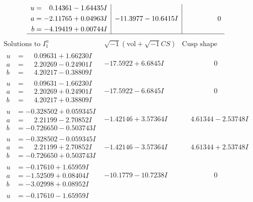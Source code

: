 \documentclass[1p]{elsarticle_modified}
\theoremstyle{definition}
\newcommand{\I}{\sqrt{-1}}
\begin{document}
$$\begin{array}{c|c|c}
\begin{aligned}
u &= \phantom{-}0.14361 - 1.64435 I \\
a &= -2.11765 + 0.04963 I \\
b &= -4.19419 + 0.00744 I\end{aligned}
 & -11.3977 - 10.6415 I & \phantom{-0.000000 } 0\\
 \hline 
 \end{array}$$\newpage$$\begin{array}{c|c|c}  
\text{Solutions to }I^u_{1}& \I (\text{vol} + \sqrt{-1}CS) & \text{Cusp shape}\\
 \hline 
\begin{aligned}
u &= \phantom{-}0.09631 + 1.66230 I \\
a &= \phantom{-}2.20269 - 0.24901 I \\
b &= \phantom{-}4.20217 - 0.38809 I\end{aligned}
 & -17.5922 + 6.6845 I & \phantom{-0.000000 } 0 \\ \hline\begin{aligned}
u &= \phantom{-}0.09631 - 1.66230 I \\
a &= \phantom{-}2.20269 + 0.24901 I \\
b &= \phantom{-}4.20217 + 0.38809 I\end{aligned}
 & -17.5922 - 6.6845 I & \phantom{-0.000000 } 0 \\ \hline\begin{aligned}
u &= -0.328502 + 0.059345 I \\
a &= \phantom{-}2.21199 - 2.70852 I \\
b &= -0.726650 - 0.503743 I\end{aligned}
 & -1.42146 + 3.57364 I & \phantom{-}4.61344 - 2.53748 I \\ \hline\begin{aligned}
u &= -0.328502 - 0.059345 I \\
a &= \phantom{-}2.21199 + 2.70852 I \\
b &= -0.726650 + 0.503743 I\end{aligned}
 & -1.42146 - 3.57364 I & \phantom{-}4.61344 + 2.53748 I \\ \hline\begin{aligned}
u &= -0.17610 + 1.65959 I \\
a &= -1.52509 + 0.08404 I \\
b &= -3.02998 + 0.08952 I\end{aligned}
 & -10.1779 - 10.7238 I & \phantom{-0.000000 } 0 \\ \hline\begin{aligned}
u &= -0.17610 - 1.65959 I \\

\end{aligned}
\end{array}$$
\end{document}
